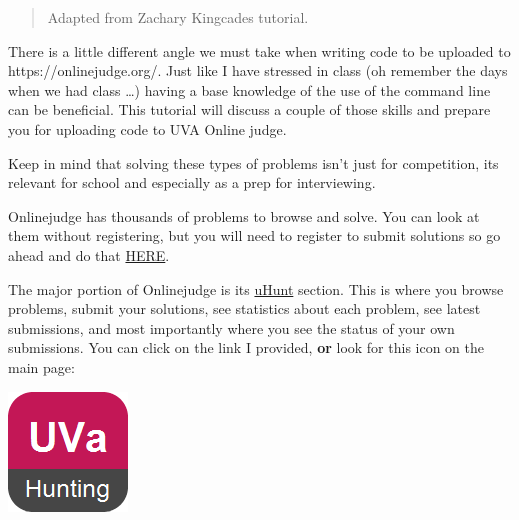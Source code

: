 \newpage
\hypertarget{uploading-to-uva-online-judge}{%
\label{uploading-to-uva-online-judge}}

\begin{quote}
Adapted from Zachary Kingcades tutorial.
\end{quote}

\hypertarget{overview}{%
\label{overview}}

There is a little different angle we must take when writing code to be
uploaded to https://onlinejudge.org/. Just like I have stressed in class
(oh remember the days when we had class \ldots) having a base knowledge
of the use of the command line can be beneficial. This tutorial will
discuss a couple of those skills and prepare you for uploading code to
UVA Online judge.

Keep in mind that solving these types of problems isn't just for
competition, its relevant for school and especially as a prep for
interviewing.

\hypertarget{registration-and-overview}{%
\label{registration-and-overview}}

Onlinejudge has thousands of problems to browse and solve. You can look
at them without registering, but you will need to register to submit
solutions so go ahead and do that
\href{https://onlinejudge.org/index.php?option=com_comprofiler\&task=registers}{HERE}.

The major portion of Onlinejudge is its
\href{https://uhunt.onlinejudge.org/}{uHunt} section. This is where you
browse problems, submit your solutions, see statistics about each
problem, see latest submissions, and most importantly where you see the
status of your own submissions. You can click on the link I provided,
\textbf{or} look for this icon on the main page:

\begin{center}
\includegraphics[scale=.4]{images/uva_icon_sp_2020.png}\\
\end{center}

\hypertarget{selecting-a-problem}{%
\label{selecting-a-problem}}

